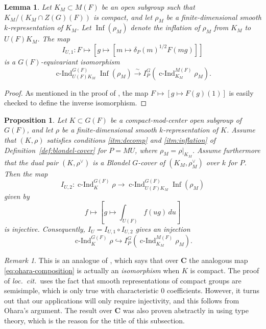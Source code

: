 \documentclass[reqno]{amsart}
\numberwithin{equation}{subsection}
\newcommand{\CC}{\mathbf{C}}
\newcommand{\co}{\colon}
\DeclareMathOperator{\cInd}{c-Ind}
\newtheorem{lemma}[thm]{Lemma}
\newtheorem{prop}[thm]{Proposition}
\theoremstyle{remark}
\newtheorem{remark}[thm]{Remark}
\numberwithin{equation}{subsection}
\numberwithin{figure}{subsection}
\begin{document}
\begin{lemma}\label{lem:ohara-32}
Let \(K_M\subset M(F)\) be an open subgroup such that \(K_M/(K_M\cap Z(G)(F))\) is compact, and let \(\rho_M\) be a finite-dimensional smooth \(k\)-representation of \(K_M\). Let \(\operatorname{Inf}(\rho_M)\) denote the inflation of \(\rho_M\) from \(K_M\) to \(U(F)K_M\). The map
\begin{equation}\label{eq:iu1}
I_{U,1}\co F\longmapsto
\left[g\longmapsto
\left[m\longmapsto \delta_P(m)^{1/2}F(mg)\right]\right]
\end{equation}
is a \(G(F)\)-equivariant isomorphism
\[
\cInd_{U(F)K_M}^{G(F)}\operatorname{Inf}(\rho_M)
\xrightarrow{\sim}
I_P^G\left(\cInd_{K_M}^{M(F)}\rho_M\right).
\]
\end{lemma}

\begin{proof}
As mentioned in the proof of \cite[Lemma~3.2]{Ohara24}, the map $F \mapsto [g \mapsto F(g)(1)]$ is easily checked to define the inverse isomorphism.
\end{proof}


\begin{prop}
\label{prop:ohara-33}
Let $K\subset G(F)$ be a compact-mod-center open subgroup of $G(F)$, and let $\rho$ be a finite-dimensional smooth $k$-representation of $K$. Assume that $(K,\rho)$ satisfies conditions \ref{itm:decomp} and \ref{itm:inflation} of Definition~\ref{def:blondel-cover} for $P=MU$, where $\rho_M=\rho|_{K_M}$. Assume furthermore that the dual pair $(K,\rho^\vee)$ is a Blondel $G$-cover of $(K_M,\rho_M^\vee)$ over $k$ for $P$. Then the map
\begin{equation}
I_{U,2}\co 
\cInd_K^{G(F)}\rho
\rightarrow
\cInd_{U(F)K_M}^{G(F)}\operatorname{Inf}(\rho_M)
\end{equation}
given by 
\begin{equation}\label{eq:iu2}
f\longmapsto
\left[g\longmapsto \int_{U(F)} f(ug)\,du\right]
\end{equation}
is injective. Consequently, $I_U=I_{U,1}\circ I_{U,2}$ gives an injection
\begin{equation}\label{eq:ohara-composition}
\cInd_K^{G(F)}\rho
\hookrightarrow
I_P^G\left(\cInd_{K_M}^{M(F)}\rho_M\right).
\end{equation}
\end{prop}

\begin{remark}
This is an analogue of \cite[Proposition 3.3]{Ohara24}, which says that over $\CC$ the analogous map \eqref{eq:ohara-composition} is actually an \emph{isomorphism} when $K$ is compact. The proof of \emph{loc.\ cit.}\ uses the fact that smooth representations of compact groups are semisimple, which is only true with characteristic $0$ coefficients. However, it turns out that our applications will only require injectivity, and this follows from Ohara's argument. The result over $\CC$ was also proven abstractly in \cite[Lemma B.3]{BS20} using type theory, which is the reason for the title of this subsection.
\end{remark}
\end{document}
